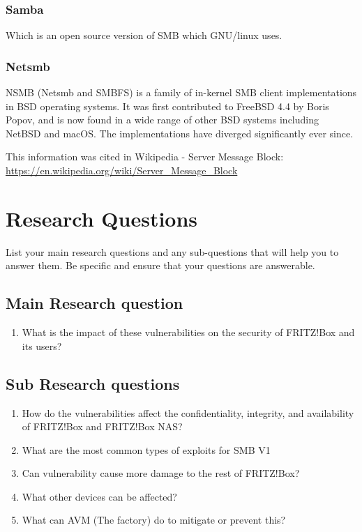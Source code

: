 \documentclass[12pt, letterpaper]{article}
\begin{document}
\subsubsection{Samba}
Which is an open source version of SMB which GNU/linux uses.

\subsubsection{Netsmb}
NSMB (Netsmb and SMBFS) is a family of in-kernel SMB client implementations in BSD operating systems. It was first contributed to FreeBSD 4.4 by Boris Popov, and is now found in a wide range of other BSD systems including NetBSD and macOS. The implementations have diverged significantly ever since.
\hfill\break
\hfill\break

This information was cited in Wikipedia - Server Message Block: \url{https://en.wikipedia.org/wiki/Server_Message_Block}

\newpage

\section{Research Questions}
List your main research questions and any sub-questions that will help you to answer them. Be specific and ensure that your questions are answerable.

\subsection{Main Research question}
\begin{enumerate}
    \item What is the impact of these vulnerabilities on the security of FRITZ!Box and its users?
\end{enumerate}

\subsection{Sub Research questions}
\begin{enumerate}
    \item How do the vulnerabilities affect the confidentiality, integrity, and availability of FRITZ!Box and FRITZ!Box NAS?
    \item What are the most common types of exploits for SMB V1 
    \item Can vulnerability cause more damage to the rest of FRITZ!Box?
    \item What other devices can be affected?
    \item What can AVM (The factory) do to mitigate or prevent this?
\end{enumerate}
\end{document}

